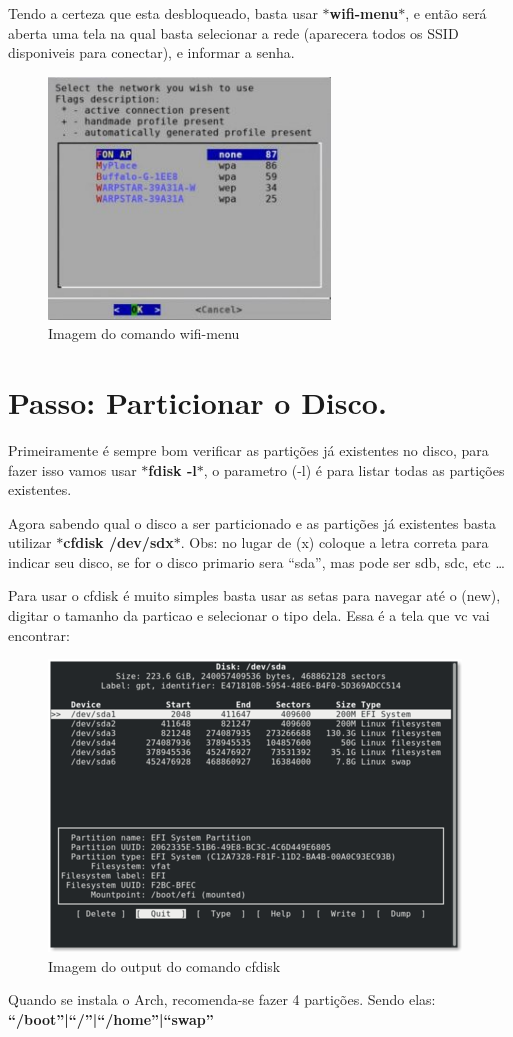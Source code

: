 \documentclass[12pt, a4paper] {article}
\begin{document}
		Tendo a certeza que esta desbloqueado, basta usar \textbf{$\ast$wifi-menu$\ast$}, e então será aberta uma tela na qual basta selecionar a rede (aparecera todos os SSID disponiveis para conectar), e informar a senha.\\
		\begin{figure}[htb]
			\centering
			\includegraphics[width=75mm]{images/wifi-menu.jpg}
			\caption{Imagem do comando wifi-menu}
			\label{fig:Wifi-menu}
		\end{figure}

	\section{Passo: Particionar o Disco.}

	Primeiramente é sempre bom verificar as partições já existentes no disco, para fazer isso vamos usar \textbf{$\ast$fdisk -l$\ast$}, o parametro (-l) é para listar todas as partições existentes.

	Agora sabendo qual o disco a ser particionado e as partições já existentes basta utilizar \textbf{$\ast$cfdisk /dev/sdx$\ast$}. Obs: no lugar de (x) coloque a letra correta para indicar seu disco, se for o disco primario sera ``sda'', mas pode ser sdb, sdc, etc \ldots

	Para usar o cfdisk é muito simples basta usar as setas para navegar até o (new), digitar o tamanho da particao e selecionar o tipo dela. Essa é a tela que vc vai encontrar:
	\begin{figure}[htb]
    \centering
    \includegraphics[width=\linewidth]{images/cfdisk.png}
    \caption{Imagem do output do comando cfdisk}
		\label{fig:cfdisk}
  \end{figure}

	Quando se instala o Arch, recomenda-se fazer 4 partições. Sendo elas:\\
	\centering\textbf{``/boot''|``/''|``/home''|``swap''}
\end{document}
